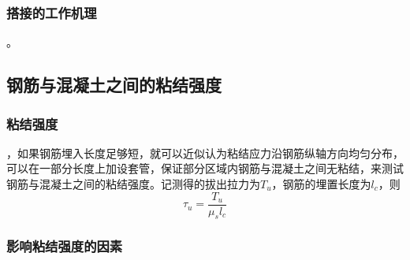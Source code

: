 \documentclass{article}
\begin{document}
\subsubsection{搭接的工作机理}
。
\subsection{钢筋与混凝土之间的粘结强度}
\subsubsection{粘结强度}
，如果钢筋埋入长度足够短，就可以近似认为粘结应力沿钢筋纵轴方向均匀分布，可以在一部分长度上加设套管，保证部分区域内钢筋与混凝土之间无粘结，来测试钢筋与混凝土之间的粘结强度。记测得的拔出拉力为$T_u$，钢筋的埋置长度为$l_c$，则
$$\tau_u=\frac{T_u}{\mu_sl_c}$$
\subsubsection{影响粘结强度的因素}
\appendix
\newpage
\newcommand{\ans}{\par\noindent答：\setlength{\parindent}{2em}}
\end{document}
